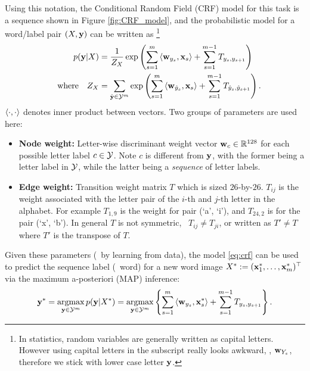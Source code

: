 \documentclass[11pt]{report}
\begin{document}
Using this notation, the Conditional Random Field (CRF) model for this task is a sequence shown in Figure \ref{fig:CRF_model},
and the probabilistic model for a word/label pair $(X, \mathbf{\boldsymbol{y}})$ can be written as%
\footnote{In statistics, random variables are generally written as capital letters.
However using capital letters in the subscript really looks awkward, \eg, $\mathbf{\boldsymbol{w}}_{Y_s}$,
therefore we stick with lower case letter $\mathbf{\boldsymbol{y}}$.}
\begin{align}
	\label{eq:crf}
	p(\mathbf{\boldsymbol{y}} | X ) &= \frac{1}{Z_X} \exp \left(\sum_{s=1}^m \left\langle \mathbf{\boldsymbol{w}}_{y_s},\mathbf{\boldsymbol{x}}_s \right\rangle + \sum_{s=1}^{m-1} T_{y_s, y_{s+1}}\right) \\
	{\quad \text{where} \quad} Z_X &= \sum_{\hat{\mathbf{\boldsymbol{y}}} \in \mathcal{Y}^m} \exp \left(\sum_{s=1}^m \left\langle \mathbf{\boldsymbol{w}}_{\hat{y}_s},\mathbf{\boldsymbol{x}}_s \right\rangle + \sum_{s=1}^{m-1} T_{\hat{y}_s, \hat{y}_{s+1}}\right).
\end{align}
%
$\left\langle \cdot,\cdot \right\rangle$ denotes inner product between vectors.
Two groups of parameters are used here:

\vspace{-1em}
\begin{itemize}
	\item {\bf Node weight:} Letter-wise discriminant weight vector $\mathbf{\boldsymbol{w}}_c \in \mathbb{R}^{128}$ for each possible letter label $c \in \mathcal{Y}$.
	Note $c$ is different from $\mathbf{\boldsymbol{y}}$,
	with the former being a letter label in $\mathcal{Y}$,
	while the latter being a \textit{sequence} of letter labels.
	\item {\bf Edge weight:} Transition weight matrix $T$ which is sized $26$-by-$26$.
	$T_{ij}$ is the weight associated with the letter pair of the $i$-th and $j$-th letter in the alphabet.  For example $T_{1,9}$ is the weight for pair (`a', `i'), and $T_{24,2}$ is for the pair (`x', `b'). In general $T$ is not symmetric, \ie\ $T_{ij} \neq T_{ji}$, or written as $T' \neq T$ where $T'$ is the transpose of $T$.
\end{itemize}

Given these parameters (\eg\ by learning from data), the model \eqref{eq:crf} can be used to predict the sequence label (\ie\ word) for a new word image $X^* := (\mathbf{\boldsymbol{x}}^*_1, \ldots, \mathbf{\boldsymbol{x}}^*_m)^\top$ via the maximum a-posteriori (MAP) inference:
\begin{align}
	\label{eq:crf_decode}
	\mathbf{\boldsymbol{y}}^* = \operatorname*{\mathrm{argmax}}_{\mathbf{\boldsymbol{y}} \in \mathcal{Y}^m} p(\mathbf{\boldsymbol{y}} | X^*)
	= \operatorname*{\mathrm{argmax}}_{\mathbf{\boldsymbol{y}} \in \mathcal{Y}^m} \left\{ \sum_{s=1}^m \left\langle \mathbf{\boldsymbol{w}}_{y_s},\mathbf{\boldsymbol{x}}^*_s \right\rangle + \sum_{s=1}^{m-1} T_{y_s, y_{s+1}}\right\}.
\end{align}
\end{document}
